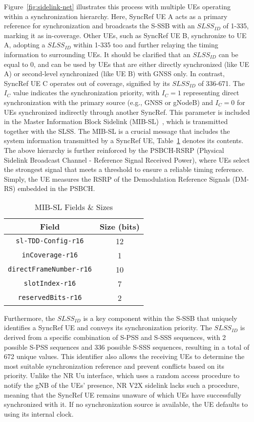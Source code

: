 Figure~\ref{fig:sidelink-net} illustrates this process with multiple UEs operating within a synchronization hierarchy. Here, SyncRef UE A acts as a primary reference for synchronization and broadcasts the S-SSB with an $SLSS_{ID}$ of 1-335, marking it as in-coverage. Other UEs, such as SyncRef UE B, synchronize to UE A, adopting a $SLSS_{ID}$ within 1-335 too and further relaying the timing information to surrounding UEs. It should be clarified that an $SLSS_{ID}$ can be equal to 0, and can be used by UEs that are either directly synchronized (like UE A) or second-level synchronized (like UE B) with GNSS only. In contrast, SyncRef UE C operates out of coverage, signified by its $SLSS_{ID}$ of 336-671. The \(I_C\) value indicates the synchronization priority, with \(I_C = 1\) representing direct synchronization with the primary source (e.g., GNSS or gNodeB) and \(I_C = 0\) for UEs synchronized indirectly through another SyncRef. This parameter is included in the Master Information Block Sidelink (MIB-SL)~\cite{3gpp.38.331}, which is transmitted together with the SLSS. The MIB-SL is a crucial message that includes the system information transmitted by a SyncRef UE, Table~\ref{tab:mib-sl} denotes its contents. The above hierarchy is further reinforced by the PSBCH-RSRP (Physical Sidelink Broadcast Channel - Reference Signal Received Power), where UEs select the strongest signal that meets a threshold to ensure a reliable timing reference. Simply, the UE measures the RSRP of the Demodulation Reference Signals (DM-RS) embedded in the PSBCH.

\begin{table}[!t]
\centering
\caption{MIB-SL Fields \& Sizes}
\label{tab:mib-sl}
\renewcommand{\arraystretch}{1.2}
\small
\begin{tabular}{c c}
\toprule
\textbf{Field} & \textbf{Size (bits)} \\
\midrule
\texttt{sl-TDD-Config-r16} & 12 \\
\texttt{inCoverage-r16} & 1 \\
\texttt{directFrameNumber-r16} & 10 \\
\texttt{slotIndex-r16} & 7 \\
\texttt{reservedBits-r16} & 2 \\
\bottomrule
\end{tabular}
\end{table}

Furthermore, the $SLSS_{ID}$ is a key component within the S-SSB that uniquely identifies a SyncRef UE and conveys its synchronization priority. The $SLSS_{ID}$ is derived from a specific combination of S-PSS and S-SSS sequences, with 2 possible S-PSS sequences and 336 possible S-SSS sequences, resulting in a total of 672 unique values. This identifier also allows the receiving UEs to determine the most suitable synchronization reference and prevent conflicts based on its priority. Unlike the NR Uu interface, which uses a random access procedure to notify the gNB of the UEs' presence, NR V2X sidelink lacks such a procedure, meaning that the SyncRef UE remains unaware of which UEs have successfully synchronized with it. If no synchronization source is available, the UE defaults to using its internal clock.

